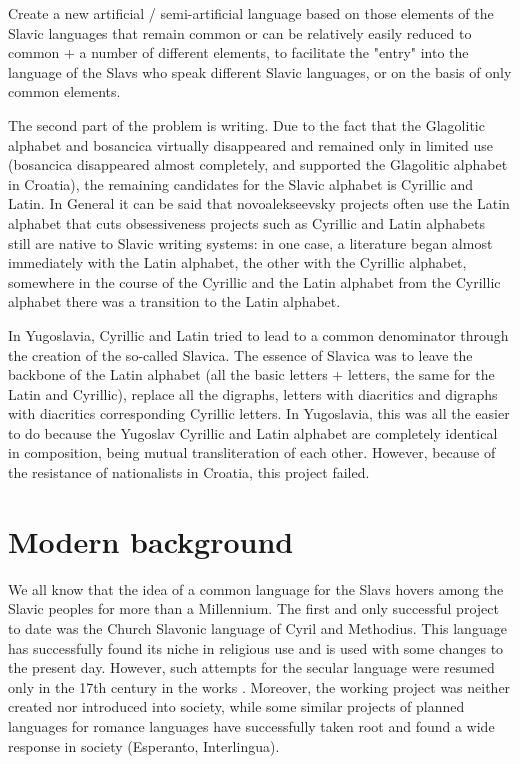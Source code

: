 Create a new artificial / semi-artificial language based on those elements of the Slavic languages that remain common or can be relatively easily reduced to common + a number of different elements, to facilitate the "entry" into the language of the Slavs who speak different Slavic languages, or on the basis of only common elements.

The second part of the problem is writing. Due to the fact that the Glagolitic alphabet and bosancica virtually disappeared and remained only in limited use (bosancica disappeared almost completely, and supported the Glagolitic alphabet in Croatia), the remaining candidates for the Slavic alphabet is Cyrillic and Latin.
In General it can be said that novoalekseevsky projects often use the Latin alphabet that cuts obsessiveness projects such as Cyrillic and Latin alphabets still are native to Slavic writing systems: in one case, a literature began almost immediately with the Latin alphabet, the other with the Cyrillic alphabet, somewhere in the course of the Cyrillic and the Latin alphabet from the Cyrillic alphabet there was a transition to the Latin alphabet.

In Yugoslavia, Cyrillic and Latin tried to lead to a common denominator through the creation of the so-called Slavica. The essence of Slavica was to leave the backbone of the Latin alphabet (all the basic letters + letters, the same for the Latin and Cyrillic), replace all the digraphs, letters with diacritics and digraphs with diacritics corresponding Cyrillic letters. In Yugoslavia, this was all the easier to do because the Yugoslav Cyrillic and Latin alphabet are completely identical in composition, being mutual transliteration of each other. However, because of the resistance of nationalists in Croatia, this project failed.

\section{Modern background}

We all know that the idea of a common language for the Slavs hovers among the Slavic peoples for more than a Millennium. The first and only successful project to date was the Church Slavonic language of Cyril and Methodius. This language has successfully found its niche in religious use and is used with some changes to the present day. However, such attempts for the secular language were resumed only in the 17th century in the works \cite{krizhanich} \cite{matija}. Moreover, the working project was neither created nor introduced into society, while some similar projects of planned languages for romance languages have successfully taken root and found a wide response in society (Esperanto, Interlingua).

